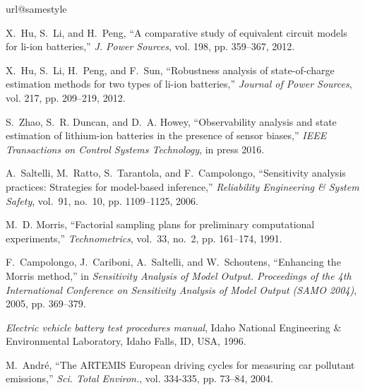 \documentclass[letterpaper,twocolumn]{IEEEtran}
\begin{document}
\begin{thebibliography}{1}
\providecommand{\url}[1]{#1}
\csname url@samestyle\endcsname
\providecommand{\newblock}{\relax}
\providecommand{\bibinfo}[2]{#2}
\providecommand{\BIBentrySTDinterwordspacing}{\spaceskip=0pt\relax}
\providecommand{\BIBentryALTinterwordstretchfactor}{4}
\providecommand{\BIBentryALTinterwordspacing}{\spaceskip=\fontdimen2\font plus
\BIBentryALTinterwordstretchfactor\fontdimen3\font minus
  \fontdimen4\font\relax}
\providecommand{\BIBforeignlanguage}[2]{{\expandafter\ifx\csname l@#1\endcsname\relax
\typeout{** WARNING: IEEEtran.bst: No hyphenation pattern has been}\typeout{** loaded for the language `#1'. Using the pattern for}\typeout{** the default language instead.}\else
\language=\csname l@#1\endcsname
\fi
#2}}
\providecommand{\BIBdecl}{\relax}
\BIBdecl

X.~Hu, S.~Li, and H.~Peng, ``A comparative study of equivalent circuit models
  for li-ion batteries,'' \emph{J. Power Sources}, vol. 198, pp. 359--367,
  2012.

X.~Hu, S.~Li, H.~Peng, and F.~Sun, ``Robustness analysis of state-of-charge
  estimation methods for two types of li-ion batteries,'' \emph{Journal of
  Power Sources}, vol. 217, pp. 209--219, 2012.

S.~Zhao, S.~R. Duncan, and D.~A. Howey, ``Observability analysis and state
  estimation of lithium-ion batteries in the presence of sensor biases,''
  \emph{IEEE Transactions on Control Systems Technology}, in press 2016.

A.~Saltelli, M.~Ratto, S.~Tarantola, and F.~Campolongo, ``Sensitivity analysis
  practices: Strategies for model-based inference,'' \emph{Reliability
  Engineering \& System Safety}, vol.~91, no.~10, pp. 1109--1125, 2006.

M.~D. Morris, ``Factorial sampling plans for preliminary computational
  experiments,'' \emph{Technometrics}, vol.~33, no.~2, pp. 161--174, 1991.

F.~Campolongo, J.~Cariboni, A.~Saltelli, and W.~Schoutens, ``Enhancing the
  {M}orris method,'' in \emph{Sensitivity Analysis of Model Output. Proceedings
  of the 4th International Conference on Sensitivity Analysis of Model Output
  (SAMO 2004)}, 2005, pp. 369--379.

\emph{Electric vehicle battery test procedures manual}, Idaho National
  Engineering \& Environmental Laboratory, Idaho Falls, ID, USA, 1996.

M.~Andr\'{e}, ``{The ARTEMIS European driving cycles for measuring car
  pollutant emissions},'' \emph{Sci. Total Environ.}, vol. 334-335, pp. 73--84,
  2004.

\end{thebibliography}
\end{document}
